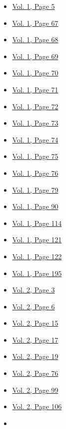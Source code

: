 \begin{itemize}
  \begin{itemize}
  \tightlist
  \item
    \protect\hyperlink{g-page-13}{Vol. 1, Page 5}
  \item
    \protect\hyperlink{g-page-75}{Vol. 1, Page 67}
  \item
    \protect\hyperlink{g-page-76}{Vol. 1, Page 68}
  \item
    \protect\hyperlink{g-page-77}{Vol. 1, Page 69}
  \item
    \protect\hyperlink{g-page-78}{Vol. 1, Page 70}
  \item
    \protect\hyperlink{g-page-79}{Vol. 1, Page 71}
  \item
    \protect\hyperlink{g-page-80}{Vol. 1, Page 72}
  \item
    \protect\hyperlink{g-page-81}{Vol. 1, Page 73}
  \item
    \protect\hyperlink{g-page-82}{Vol. 1, Page 74}
  \item
    \protect\hyperlink{g-page-83}{Vol. 1, Page 75}
  \item
    \protect\hyperlink{g-page-84}{Vol. 1, Page 76}
  \item
    \protect\hyperlink{g-page-87}{Vol. 1, Page 79}
  \item
    \protect\hyperlink{g-page-98}{Vol. 1, Page 90}
  \item
    \protect\hyperlink{g-page-122}{Vol. 1, Page 114}
  \item
    \protect\hyperlink{g-page-129}{Vol. 1, Page 121}
  \item
    \protect\hyperlink{g-page-130}{Vol. 1, Page 122}
  \item
    \protect\hyperlink{g-page-203}{Vol. 1, Page 195}
  \item
    \protect\hyperlink{g-page-215}{Vol. 2, Page 3}
  \item
    \protect\hyperlink{g-page-218}{Vol. 2, Page 6}
  \item
    \protect\hyperlink{g-page-227}{Vol. 2, Page 15}
  \item
    \protect\hyperlink{g-page-229}{Vol. 2, Page 17}
  \item
    \protect\hyperlink{g-page-231}{Vol. 2, Page 19}
  \item
    \protect\hyperlink{g-page-288}{Vol. 2, Page 76}
  \item
    \protect\hyperlink{g-page-311}{Vol. 2, Page 99}
  \item
    \protect\hyperlink{g-page-318}{Vol. 2, Page 106}
  \item

\end{itemize}
\end{itemize}
